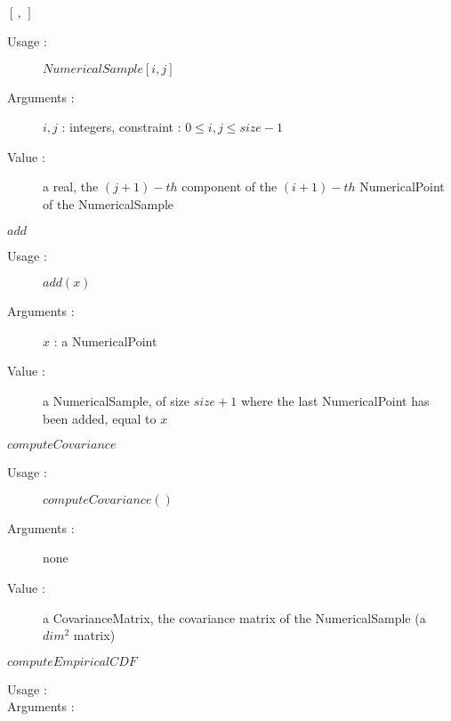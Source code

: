 \begin{description}
\begin{description}
  \item $[\,, \,]$
    \begin{description}
    \item[Usage :] $NumericalSample[i,j]$
    \item[Arguments :] $i,j$ : integers, constraint : $ 0 \leq i,j \leq size -1$
    \item[Value :] a real, the $(j+1)-th$ component of the  $(i+1)-th$ NumericalPoint of the NumericalSample
    \end{description}
    \bigskip



  \item $add$
    \begin{description}
    \item[Usage :] $add(x)$
    \item[Arguments :] $x$ : a NumericalPoint
    \item[Value :] a NumericalSample, of size $size+1$ where the last NumericalPoint has been added, equal to $x$
    \end{description}
    \bigskip


  \item $computeCovariance$
    \begin{description}
    \item[Usage :] $computeCovariance()$
    \item[Arguments :] none
    \item[Value :] a CovarianceMatrix, the covariance matrix of the NumericalSample (a $dim^2$ matrix)
    \end{description}
    \bigskip

  \item $computeEmpiricalCDF$
    \begin{description}
    \item[Usage :]  \rule{0pt}{1em}
    \item[Arguments :] \rule{0pt}{1em}


\end{description}
\end{description}
\end{description}
